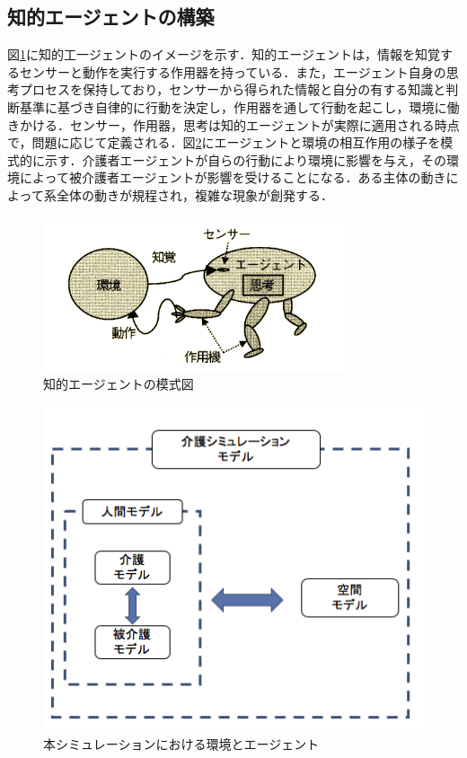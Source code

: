 \subsection{知的エージェントの構築}
図\ref{intelligent_agent}に知的工一ジェントのイメージを示す．知的エージェントは，情報を知覚するセンサーと動作を実行する作用器を持っている．また，エージェント自身の思考プロセスを保持しており，センサーから得られた情報と自分の有する知識と判断基準に基づき自律的に行動を決定し，作用器を通して行動を起こし，環境に働きかける．センサー，作用器，思考は知的エージェントが実際に適用される時点で，問題に応じて定義される．図\ref{agent_modeling}にエージェントと環境の相互作用の様子を模式的に示す．介護者エージェントが自らの行動により環境に影響を与え，その環境によって被介護者エージェントが影響を受けることになる．ある主体の動きによって系全体の動きが規程され，複雑な現象が創発する．

\begin{figure}[htb]
\begin{center}
 \includegraphics[scale=0.8]{figures/intelligent_agent.png}
 \caption[知的エージェントの模式図]{知的エージェントの模式図 \label{intelligent_agent}}
\end{center}
\end{figure}

\begin{figure}[htb]
\begin{center}
 \includegraphics[scale=0.6]{figures/agent_modeling.png}
 \caption[本シミュレーションにおける環境とエージェント]{本シミュレーションにおける環境とエージェント \label{agent_modeling}}
\end{center}
\end{figure}

